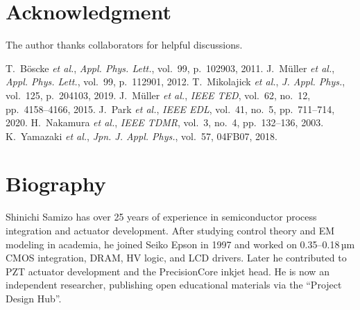 \documentclass[conference]{IEEEtran}
\begin{document}
\section*{Acknowledgment}
The author thanks collaborators for helpful discussions.


\begin{thebibliography}{99}
 T.~Böscke \emph{et al.}, \emph{Appl. Phys. Lett.}, vol.~99, p.~102903, 2011.
 J.~Müller \emph{et al.}, \emph{Appl. Phys. Lett.}, vol.~99, p.~112901, 2012.
 T.~Mikolajick \emph{et al.}, \emph{J. Appl. Phys.}, vol.~125, p.~204103, 2019.
 J.~Müller \emph{et al.}, \emph{IEEE TED}, vol.~62, no.~12, pp.~4158--4166, 2015.
 J.~Park \emph{et al.}, \emph{IEEE EDL}, vol.~41, no.~5, pp.~711--714, 2020.
 H.~Nakamura \emph{et al.}, \emph{IEEE TDMR}, vol.~3, no.~4, pp.~132--136, 2003.
 K.~Yamazaki \emph{et al.}, \emph{Jpn. J. Appl. Phys.}, vol.~57, 04FB07, 2018.
\end{thebibliography}

\section*{Biography}
Shinichi Samizo has over 25 years of experience in semiconductor process integration and actuator development.  
After studying control theory and EM modeling in academia, he joined Seiko Epson in 1997 and worked on 0.35--0.18\,µm CMOS integration, DRAM, HV logic, and LCD drivers.  
Later he contributed to PZT actuator development and the PrecisionCore inkjet head.  
He is now an independent researcher, publishing open educational materials via the ``Project Design Hub''.
\end{document}
